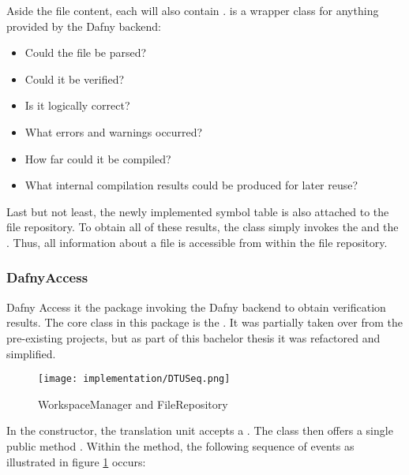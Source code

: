Aside the file content, each  will also contain .
 is a wrapper class for anything provided by the Dafny backend:
\begin{itemize}
    \item Could the file be parsed?
    \item Could it be verified?
    \item Is it logically correct?
    \item What errors and warnings occurred?
    \item How far could it be compiled?
    \item What internal compilation results could be produced for later reuse?
\end{itemize}

Last but not least, the newly implemented symbol table is also attached to the file repository.
To obtain all of these results, the class simply invokes the  and the .
Thus, all information about a file is accessible from within the file repository.


\subsubsection{DafnyAccess}
Dafny Access it the package invoking the Dafny backend to obtain verification results.
The core class in this package is the .
It was partially taken over from the pre-existing projects, but as part of this bachelor thesis it was refactored and simplified.\\

\begin{figure}[h]
    \centering
    \texttt{[image: implementation/DTUSeq.png]}
    \caption{WorkspaceManager and FileRepository}
    \label{fig:DTUSeq}
\end{figure}

In the constructor, the translation unit accepts a .
The class then offers a single public method .
Within the method, the following sequence of events as illustrated in figure \ref{fig:DTUSeq} occurs:

